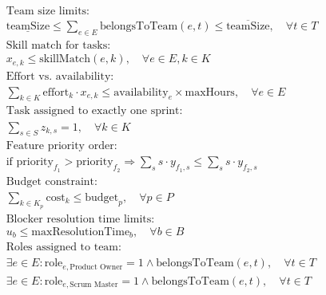 \documentclass{article}
\begin{document}
\begin{align}
    & \text{Team size limits:} \nonumber \\
    & \underline{\text{teamSize}} \leq \sum_{e \in E} \text{belongsToTeam}(e,t) \leq \overline{\text{teamSize}}, \quad \forall t \in T \\
    & \text{Skill match for tasks:} \nonumber \\
    & x_{e,k} \leq \text{skillMatch}(e,k), \quad \forall e \in E, k \in K \\
    & \text{Effort vs. availability:} \nonumber \\
    & \sum_{k \in K} \text{effort}_k \cdot x_{e,k} \leq \text{availability}_e \times \text{maxHours}, \quad \forall e \in E \\
    & \text{Task assigned to exactly one sprint:} \nonumber \\
    & \sum_{s \in S} z_{k,s} = 1, \quad \forall k \in K \\
    & \text{Feature priority order:} \nonumber \\
    & \text{if } \text{priority}_{f_1} > \text{priority}_{f_2} \Rightarrow \sum_{s} s \cdot y_{f_1,s} \leq \sum_{s} s \cdot y_{f_2,s} \\
    & \text{Budget constraint:} \nonumber \\
    & \sum_{k \in K_p} \text{cost}_k \leq \text{budget}_p, \quad \forall p \in P \\
    & \text{Blocker resolution time limits:} \nonumber \\
    & u_b \leq \text{maxResolutionTime}_b, \quad \forall b \in B \\
    & \text{Roles assigned to team:} \nonumber \\
    & \exists e \in E : \text{role}_{e,\text{Product Owner}}=1 \wedge \text{belongsToTeam}(e,t), \quad \forall t \in T \\
    & \exists e \in E : \text{role}_{e,\text{Scrum Master}}=1 \wedge \text{belongsToTeam}(e,t), \quad \forall t \in T
\end{align}
\end{document}
